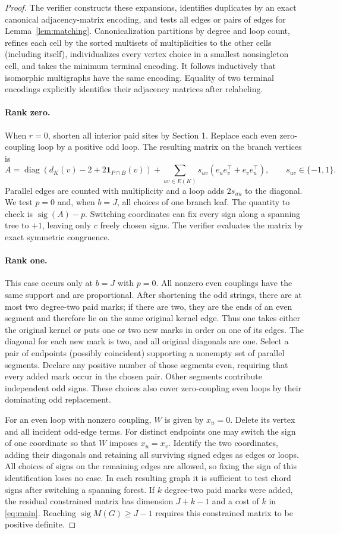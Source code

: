\documentclass[11pt]{article}
\newcommand{\sg}{\operatorname{sig}}
\newcommand{\diag}{\operatorname{diag}}
\begin{document}
\begin{proof}
The verifier constructs these expansions, identifies duplicates by an exact canonical adjacency-matrix encoding, and tests all edges or pairs of edges for Lemma~\ref{lem:matching}. Canonicalization partitions by degree and loop count, refines each cell by the sorted multisets of multiplicities to the other cells (including itself), individualizes every vertex choice in a smallest nonsingleton cell, and takes the minimum terminal encoding. It follows inductively that isomorphic multigraphs have the same encoding. Equality of two terminal encodings explicitly identifies their adjacency matrices after relabeling.

\paragraph{Rank zero.}
When $r=0$, shorten all interior paid sites by Section 1. Replace each even zero-coupling loop by a positive odd loop. The resulting matrix on the branch vertices is
\[
A=\diag(d_K(v)-2+2\mathbf1_{P\cap B}(v))
  +\sum_{uv\in E(K)}s_{uv}(e_ue_v^\top+e_ve_u^\top),\qquad s_{uv}\in\{-1,1\}.
\]
Parallel edges are counted with multiplicity and a loop adds $2s_{uu}$ to the diagonal. We test $p=0$ and, when $b=J$, all choices of one branch leaf. The quantity to check is $\sg(A)-p$. Switching coordinates can fix every sign along a spanning tree to $+1$, leaving only $c$ freely chosen signs. The verifier evaluates the matrix by exact symmetric congruence.

\paragraph{Rank one.}
This case occurs only at $b=J$ with $p=0$. All nonzero even couplings have the same support and are proportional. After shortening the odd strings, there are at most two degree-two paid marks; if there are two, they are the ends of an even segment and therefore lie on the same original kernel edge. Thus one takes either the original kernel or puts one or two new marks in order on one of its edges. The diagonal for each new mark is two, and all original diagonals are one. Select a pair of endpoints (possibly coincident) supporting a nonempty set of parallel segments. Declare any positive number of those segments even, requiring that every added mark occur in the chosen pair. Other segments contribute independent odd signs. These choices also cover zero-coupling even loops by their dominating odd replacement.

For an even loop with nonzero coupling, $W$ is given by $x_u=0$. Delete its vertex and all incident odd-edge terms. For distinct endpoints one may switch the sign of one coordinate so that $W$ imposes $x_u=x_v$. Identify the two coordinates, adding their diagonals and retaining all surviving signed edges as edges or loops. All choices of signs on the remaining edges are allowed, so fixing the sign of this identification loses no case. In each resulting graph it is sufficient to test chord signs after switching a spanning forest. If $k$ degree-two paid marks were added, the residual constrained matrix has dimension $J+k-1$ and a cost of $k$ in \eqref{eq:main}. Reaching $\sg M(G)\ge J-1$ requires this constrained matrix to be positive definite.


\end{proof}
\end{document}
